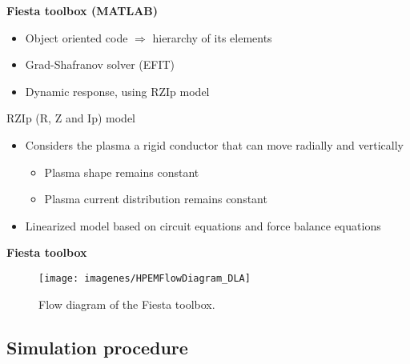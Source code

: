 \documentclass[10pt]{beamer}
\begin{document}
\begin{frame}{\bf Fiesta toolbox (MATLAB)}
	\begin{itemize}
		\item Object oriented code $\Rightarrow$ hierarchy of its elements
		\item Grad-Shafranov solver (EFIT)
		\item Dynamic response, using RZIp model		
	\end{itemize}

	\begin{block}{RZIp (R, Z and Ip) model}
		\begin{itemize}
			\item Considers the plasma a rigid conductor that can move radially and vertically
			\begin{itemize}
				\item Plasma shape remains constant
				\item Plasma current distribution remains constant
			\end{itemize}
			\item Linearized model based on circuit equations and force balance equations
		\end{itemize}
	\end{block}

\end{frame}

\begin{frame}{\bf Fiesta toolbox}
	\begin{figure}[htbp]
	\centering
	\texttt{[image: imagenes/HPEMFlowDiagram\_DLA]}
	\caption{Flow diagram of the Fiesta toolbox.}
	\label{fig_diagram_Fiesta}
	\end{figure}
\end{frame}


\subsection{Simulation procedure}
\end{document}
